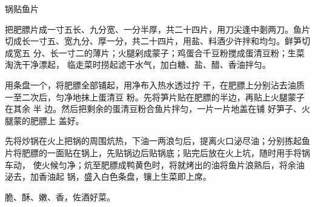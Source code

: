 \begin{recipe}{锅贴鱼片}

\ingredients


\cooking

\step 把肥膘片成一寸五长、九分宽、一分半厚，共二十四片，用刀尖逢中剗两刀。鱼片
切成长一寸五、宽九分、厚一分，共二十四片，用盐、料酒少许拌和均匀。鲜笋切成宽五
分、长一寸二的薄片；火腿剁成蒙子；鸡蛋合千豆粉搅成蛋清豆粉；生菜淘洗干净漂起，
临走菜时捞起滤干水气，加白糖、盐、醋、香油拌匀。

\step 用条盘一个，将肥膘全部铺起，用净布入热水透过拧 干，在肥膘上分别沾去油质
一至二次后，匀净地抹上蛋清豆 粉。先将笋片贴在肥膘的半边，再贴上火腿蒙子在其余
半 边。然后把剩余的蛋清豆粉合鱼片拌匀，一片一片地盖在铺 好笋子、火腿蒙的肥膘上
盖好。

\step 先将炒锅在火上把锅的周围炕热，下油一两浪匀后，提离火口泌尽油；分别拣起鱼
片将肥膘的一面贴在锅上，先贴锅边后贴锅底；贴完后放在火上坑，随时用手将锅车动，
使火候匀净；炕至肥膘成鸭黄色时，将就烤出的油将鱼片浪熟后，将余油泌去，加香油起
锅，盛入白色条盘，镶上生菜即上席。

\features

脆、酥、嫩、香，佐酒好菜。

\end{recipe}

